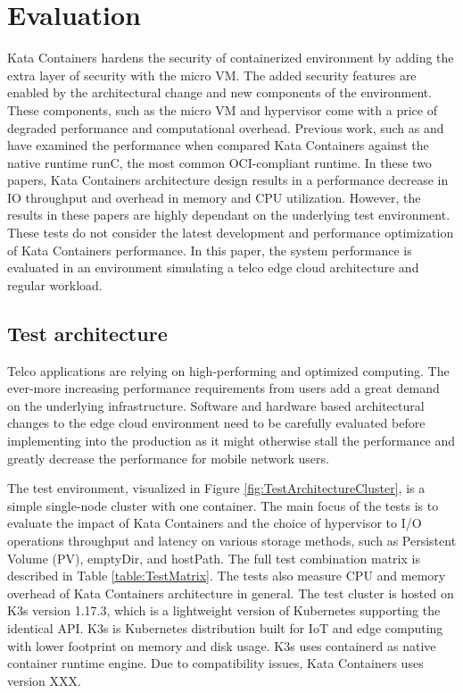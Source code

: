 \chapter{Evaluation}
\label{chapter:evaluation}

Kata Containers hardens the security of containerized environment by adding the extra layer of security with the micro VM. The added security features are enabled by the architectural change and new components of the environment. These components, such as the micro VM and hypervisor come with a price of degraded performance and computational overhead. Previous work, such as \cite{EverartsdeVelp2020} and \cite{Kumar2020} have examined the performance when compared Kata Containers against the native runtime runC, the most common OCI-compliant runtime. In these two papers, Kata Containers architecture design results in a performance decrease in IO throughput and overhead in memory and CPU utilization. However, the results in these papers are highly dependant on the underlying test environment. These tests do not consider the latest development and performance optimization of Kata Containers performance. In this paper, the system performance is evaluated in an environment simulating a telco edge cloud architecture and regular workload.

\section{Test architecture}
\label{section:test_architecture}

Telco applications are relying on high-performing and optimized computing. The ever-more increasing performance requirements from users add a great demand on the underlying infrastructure. Software and hardware based architectural changes to the edge cloud environment need to be carefully evaluated before implementing into the production as it might otherwise stall the performance and greatly decrease the performance for mobile network users.

The test environment, visualized in Figure \ref{fig:TestArchitectureCluster}, is a simple single-node cluster with one container. The main focus of the tests is to evaluate the impact of Kata Containers and the choice of hypervisor to I/O operations throughput and latency on various storage methods, such as Persistent Volume (PV), emptyDir, and hostPath. The full test combination matrix is described in Table \ref{table:TestMatrix}. The tests also measure CPU and memory overhead of Kata Containers architecture in general. The test cluster is hosted on K3s\cite{K3s} version 1.17.3, which is a lightweight version of Kubernetes supporting the identical API. K3s is Kubernetes distribution built for IoT and edge computing with lower footprint on memory and disk usage. K3s uses containerd as native container runtime engine. Due to compatibility issues, Kata Containers uses version XXX.

